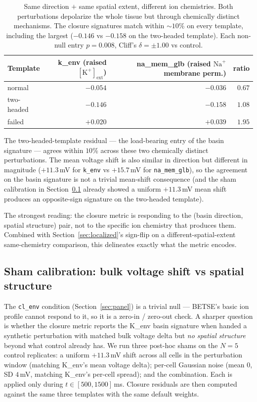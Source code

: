 \documentclass[11pt,a4paper]{article}
\begin{document}
\begin{table}[h]\centering\small
\caption{Same direction $+$ same spatial extent, different ion chemistries. Both perturbations depolarize the whole tissue but through chemically distinct mechanisms. The closure signatures match within $\sim$$10$\% on every template, including the largest ($-0.146$ vs $-0.158$ on the two-headed template). Each non-null entry $p=0.008$, Cliff's $\delta=\pm 1.00$ vs control.}\label{tab:cross-chem}
\begin{tabular}{lrrr}\toprule
Template     & k\_env (raised $[\mathrm{K}^{+}]_{\mathrm{ext}}$) & na\_mem\_glb (raised $\mathrm{Na}^{+}$ membrane perm.) & ratio \\
\midrule
normal       & $-0.054$  & $-0.036$ & $0.67$ \\
two-headed   & $\mathbf{-0.146}$ & $\mathbf{-0.158}$ & $\mathbf{1.08}$ \\
failed       & $+0.020$ & $+0.039$ & $1.95$ \\
\bottomrule\end{tabular}
\end{table}

The two-headed-template residual --- the load-bearing entry of the basin signature --- agrees within $10$\% across these two chemically distinct perturbations. The mean voltage shift is also similar in direction but different in magnitude ($+11.3$\,mV for \texttt{k\_env} vs $+15.7$\,mV for \texttt{na\_mem\_glb}), so the agreement on the basin signature is not a trivial mean-shift consequence (and the sham calibration in Section~\ref{sec:sham} already showed a uniform $+11.3$\,mV mean shift produces an opposite-sign signature on the two-headed template).

The strongest reading: the closure metric is responding to the (basin direction, spatial structure) pair, not to the specific ion chemistry that produces them. Combined with Section~\ref{sec:localized}'s sign-flip on a different-spatial-extent same-chemistry comparison, this delineates exactly what the metric encodes.

\subsection{Sham calibration: bulk voltage shift vs spatial structure}\label{sec:sham}

The \texttt{cl\_env} condition (Section~\ref{sec:panel}) is a trivial null --- BETSE's basic ion profile cannot respond to it, so it is a zero-in / zero-out check. A sharper question is whether the closure metric reports the K\_env basin signature when handed a synthetic perturbation with matched bulk voltage delta but \emph{no spatial structure} beyond what control already has. We run three post-hoc shams on the $N=5$ control replicates: a uniform $+11.3$\,mV shift across all cells in the perturbation window (matching K\_env's mean voltage delta); per-cell Gaussian noise (mean $0$, SD $4$\,mV, matching K\_env's per-cell spread); and the combination. Each is applied only during $t\in[500,1500]$\,ms. Closure residuals are then computed against the same three templates with the same default weights.
\end{document}
